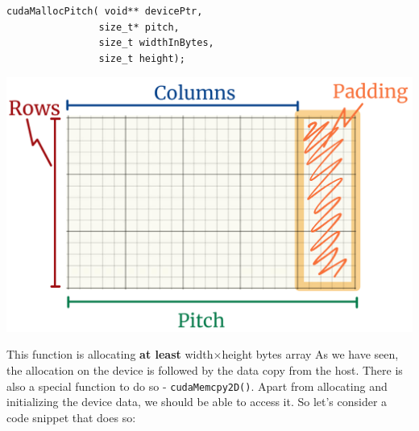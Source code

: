 \begin{minipage}[h]{0.5\textwidth}
   \vspace{-1cm}
     \begin{verbatim}
cudaMallocPitch( void** devicePtr,
                size_t* pitch,
                size_t widthInBytes,
                size_t height);
     \end{verbatim}
\end{minipage}
\begin{minipage}{0.4\textwidth}
   \hspace{0.2cm}
\includegraphics[scale=0.10]{pngs/pitch.png}
\label{fig:pitch}
\hspace{1cm}
\end{minipage}

This function is allocating \textbf{at least} width$\times$height bytes array
As we have seen, the allocation on the device is followed by the data copy from 
the host. There is also a special function to do so - \verb|cudaMemcpy2D()|. Apart from allocating 
and initializing the device data, we should be able to access it. So let's consider a code snippet
that does so:

